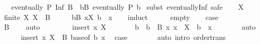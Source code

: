 \begin{isabellebody}
\ \ \ {\isachardoublequoteopen}eventually\ P\ {\isacharparenleft}{\kern0pt}Inf\ B{\isacharparenright}{\kern0pt}\ {\isasymlongleftrightarrow}\ {\isacharparenleft}{\kern0pt}{\isasymexists}b{\isasymin}B{\isachardot}{\kern0pt}\ eventually\ P\ b{\isacharparenright}{\kern0pt}{\isachardoublequoteclose}\isanewline
%
\isadelimproof
%
\endisadelimproof
%
\isatagproof
{}\isamarkupfalse%
\ {\isacharparenleft}{\kern0pt}subst\ eventually{\isacharunderscore}{\kern0pt}Inf{\isacharcomma}{\kern0pt}\ safe{\isacharparenright}{\kern0pt}\isanewline
\ \ \isamarkupfalse%
\ X\ \isamarkupfalse%
\ {\isachardoublequoteopen}finite\ X{\isachardoublequoteclose}\ {\isachardoublequoteopen}X\ {\isasymsubseteq}\ B{\isachardoublequoteclose}\isanewline
\ \ \isamarkupfalse%
\ \isamarkupfalse%
\ {\isachardoublequoteopen}{\isasymexists}b{\isasymin}B{\isachardot}{\kern0pt}\ {\isasymforall}x{\isasymin}X{\isachardot}{\kern0pt}\ b\ {\isasymle}\ x{\isachardoublequoteclose}\isanewline
\ \ \isamarkupfalse%
\ induct\isanewline
\ \ \ \ \isamarkupfalse%
\ empty\ \isamarkupfalse%
\ \isamarkupfalse%
\ {\isacharquery}{\kern0pt}case\isanewline
\ \ \ \ \ \ \isamarkupfalse%
\ {\isacartoucheopen}B\ {\isasymnoteq}\ {\isacharbraceleft}{\kern0pt}{\isacharbraceright}{\kern0pt}{\isacartoucheclose}\ \isamarkupfalse%
\ auto\isanewline
\ \ \isamarkupfalse%
\isanewline
\ \ \ \ \isamarkupfalse%
\ {\isacharparenleft}{\kern0pt}insert\ x\ X{\isacharparenright}{\kern0pt}\isanewline
\ \ \ \ \isamarkupfalse%
\ \isamarkupfalse%
\ b\ \ {\isachardoublequoteopen}b\ {\isasymin}\ B{\isachardoublequoteclose}\ {\isachardoublequoteopen}{\isasymAnd}x{\isachardot}{\kern0pt}\ x\ {\isasymin}\ X\ {\isasymLongrightarrow}\ b\ {\isasymle}\ x{\isachardoublequoteclose}\isanewline
\ \ \ \ \ \ \isamarkupfalse%
\ auto\isanewline
\ \ \ \ \isamarkupfalse%
\ {\isacartoucheopen}insert\ x\ X\ {\isasymsubseteq}\ B{\isacartoucheclose}\ base{\isacharbrackleft}{\kern0pt}of\ b\ x{\isacharbrackright}{\kern0pt}\ \isamarkupfalse%
\ {\isacharquery}{\kern0pt}case\isanewline
\ \ \ \ \ \ \isamarkupfalse%
\ {\isacharparenleft}{\kern0pt}auto\ intro{\isacharcolon}{\kern0pt}\ order{\isacharunderscore}{\kern0pt}trans{\isacharparenright}{\kern0pt}\isanewline
\ \ \isamarkupfalse%
\isanewline
\ \ \isamarkupfalse%

\end{isabellebody}
